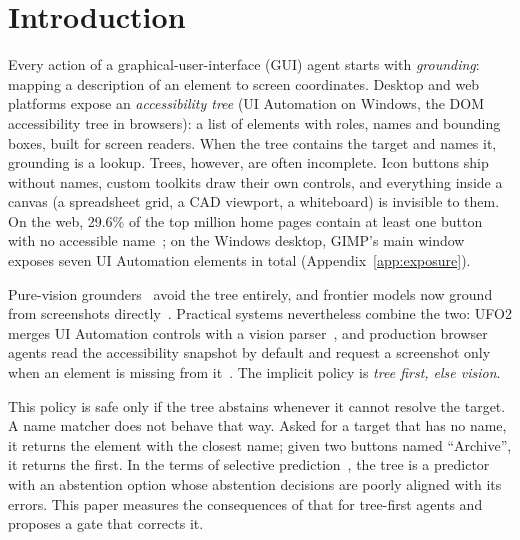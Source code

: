 \documentclass[11pt]{article}
\begin{document}
\section{Introduction}

Every action of a graphical-user-interface (GUI) agent starts with \emph{grounding}: mapping a description
of an element to screen coordinates. Desktop and web platforms expose an \emph{accessibility tree}
(UI Automation on Windows, the DOM accessibility tree in browsers): a list of elements with roles, names
and bounding boxes, built for screen readers. When the tree contains the target and names it, grounding
is a lookup. Trees, however, are often incomplete. Icon buttons ship without names, custom toolkits draw
their own controls, and everything inside a canvas (a spreadsheet grid, a CAD viewport, a whiteboard) is
invisible to them. On the web, 29.6\% of the top million home pages contain at least one button with no
accessible name~\citep{webaim2025}; on the Windows desktop, GIMP's main window exposes seven UI
Automation elements in total (Appendix~\ref{app:exposure}).

Pure-vision grounders~\citep{cheng2024seeclick,lin2025showui,gou2025uground,wu2025osatlas,yang2025ariaui}
avoid the tree entirely, and frontier models now ground from screenshots directly~\citep{anthropic2024computeruse,qin2025uitars}.
Practical systems nevertheless combine the two: UFO2 merges UI Automation controls with a vision
parser~\citep{zhang2025ufo2}, and production browser agents read the accessibility snapshot by default and
request a screenshot only when an element is missing from it~\citep{vardanyan2025browser}. The implicit
policy is \emph{tree first, else vision}.

This policy is safe only if the tree abstains whenever it cannot resolve the target. A name matcher
does not behave that way. Asked for a target that has no name, it returns the element with the closest name;
given two buttons named ``Archive'', it returns the first. In the terms of selective
prediction~\citep{elyaniv2010selective,geifman2017selective}, the tree is a predictor with an abstention
option whose abstention decisions are poorly aligned with its errors. This paper measures the consequences
of that for tree-first agents and proposes a gate that corrects it.
\end{document}
